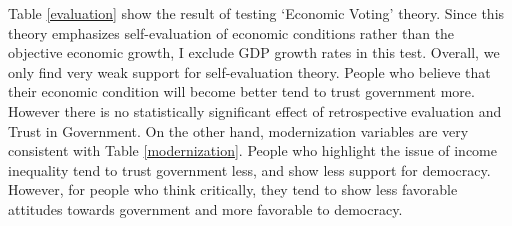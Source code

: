 \documentclass[12pt]{article}\usepackage[]{graphicx}\usepackage[]{color}
\begin{document}
Table \ref{evaluation} show the result of testing `Economic Voting' theory. Since this theory emphasizes self-evaluation of economic conditions rather than the objective economic growth, I exclude GDP growth rates in this test. Overall, we only find very weak support for self-evaluation theory. People who believe that their economic condition will become better tend to trust government more. However there is no statistically significant effect of retrospective evaluation and Trust in Government. On the other hand, modernization variables are very consistent with Table \ref{modernization}. People who highlight the issue of income inequality tend to trust government less, and show less support for democracy. However, for people who think critically, they tend to show less favorable attitudes towards government and more favorable to democracy.
\end{document}
